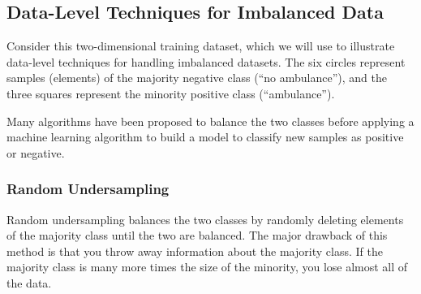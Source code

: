 \subsection{Data-Level Techniques for Imbalanced Data}

Consider this two-dimensional training dataset, which we will use to illustrate data-level techniques for handling imbalanced datasets.    The six circles represent samples (elements) of the majority negative class (``no ambulance''), and the three squares represent the minority positive class (``ambulance'').  


\begin{center}
\end{center}

Many algorithms have been proposed to balance the two classes before applying a machine learning algorithm to build a model to classify new samples as positive or negative.  %



\subsubsection{Random Undersampling}

Random undersampling balances the two classes by randomly deleting elements of the majority class until the two are balanced.  The major drawback of this method is that you throw away information about the majority class.  If the majority class is many more times the size of the minority, you lose almost all of the data.  


